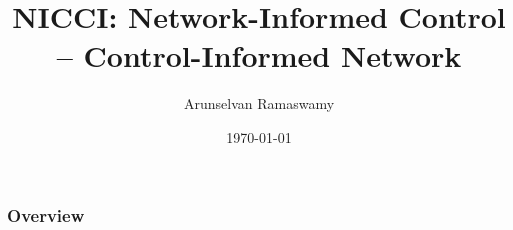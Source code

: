 \documentclass{beamer}
\title[NICCI]{NICCI: Network-Informed Control -- Control-Informed Network} %
\author[Arun]{Arunselvan Ramaswamy %
 } %
\institute[Paderborn University] %
{
Dept. of Electrical Engineering and Information Technology, \\
Paderborn University \\ %
\textit{arunselvan.ramaswamy@upb.de}\\
}
\date{\today} %
\begin{document}
\begin{frame}
\titlepage %
\end{frame}

\begin{frame}
\frametitle{Overview} %
\tableofcontents %
\end{frame}
\end{document}
